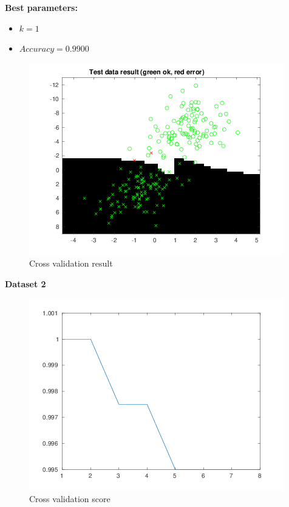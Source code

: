 \documentclass[a4paper,12pt]{article}
\begin{document}
\textbf{Best parameters:}
\begin{itemize}
\item $k = 1$
\item $Accuracy = 0.9900$
\end{itemize}

\begin{figure}[H]
\centering
\caption{Cross validation result}\label{fig:kNN-1-cv}
  \begin{minipage}[]{1\textwidth}
  \includegraphics[width=\textwidth]{figures/kNN_1_cv.png}
  \end{minipage}
\end{figure}

\noindent \textbf{Dataset 2}

\begin{figure}[H]
\centering
\caption{Cross validation score}\label{fig:kNN-2-cv-score}
  \begin{minipage}[]{1\textwidth}
  \includegraphics[width=\textwidth]{figures/kNN_2_cv_score.png}
  \end{minipage}
\end{figure}
\end{document}
